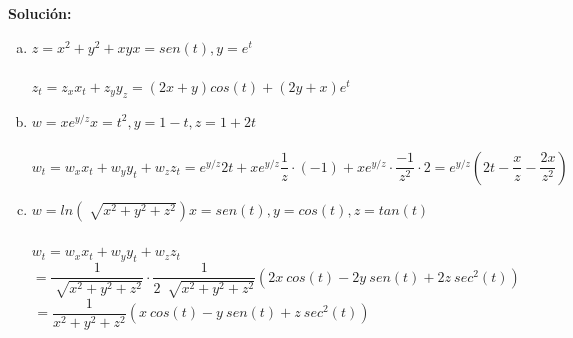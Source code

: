 \documentclass[12pt]{article}
\newenvironment{solucion}
{\begin{mdframed}[backgroundcolor=black!10]
		{\bf Solución:}\\
	}
	{
	\end{mdframed}
}
\newenvironment{preguntas}
{\begin{enumerate}\itemsep12pt
	}
	{
	\end{enumerate}
}
\begin{document}
\begin{preguntas}
\begin{solucion}
\begin{enumerate}[a)]
\item $z = x^2+y^2+xy$\tab$x=sen(t), y=e^t$\\
			\\
			$z_t = z_x x_t + z_y y_z = (2x+y)cos(t) + (2y+x)e^t$
\item $w=xe^{y/z}$\tab$x=t^2, y=1-t, z=1+2t$\\
			\\
			{\small$w_t = w_x x_t + w_y y_t + w_z z_t = e^{y/z} 2t + xe^{y/z}\dfrac{1}{z}\cdot(-1) + xe^{y/z} \cdot \dfrac{-1}{z^2}\cdot 2 = e^{y/z}\left(2t - \dfrac{x}{z} - \dfrac{2x}{z^2}\right)$}
\item $w=ln(\sqrt[]{x^2+y^2+z^2})$\tab$x=sen(t), y=cos(t), z=tan(t)$\\
			\\
			$w_t = w_x x_t + w_y y_t + w_z z_t$
			$$ = \dfrac{1}{\sqrt[]{x^2+y^2+z^2}}\cdot \dfrac{1}{2\ \sqrt[]{x^2+y^2+z^2}} (2x\ cos(t) - 2y\ sen(t) + 2z\ sec^2(t))$$
			$$ = \dfrac{1}{x^2+y^2+z^2} (x\ cos(t) - y\ sen(t) + z\ sec^2(t)) \qquad \qquad \qquad \qquad \qquad$$
\end{enumerate}
\end{solucion}
\end{preguntas}
\end{document}

